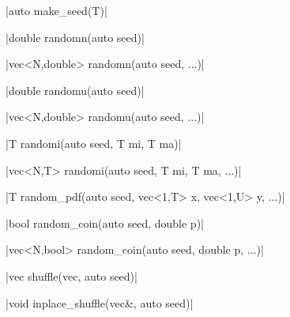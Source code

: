 \funcitem \cppinline|auto make_seed(T)| 

\funcitem \cppinline|double randomn(auto seed)| 

\cppinline|vec<N,double> randomn(auto seed, ...)|

\funcitem \cppinline|double randomu(auto seed)| 

\cppinline|vec<N,double> randomu(auto seed, ...)|

\funcitem \cppinline|T randomi(auto seed, T mi, T ma)| 

\cppinline|vec<N,T> randomi(auto seed, T mi, T ma, ...)|

\funcitem \cppinline|T random_pdf(auto seed, vec<1,T> x, vec<1,U> y, ...)| 

\funcitem \cppinline|bool random_coin(auto seed, double p)| 

\cppinline|vec<N,bool> random_coin(auto seed, double p, ...)|

\funcitem \cppinline|vec shuffle(vec, auto seed)| 

\cppinline|void inplace_shuffle(vec&, auto seed)| 
